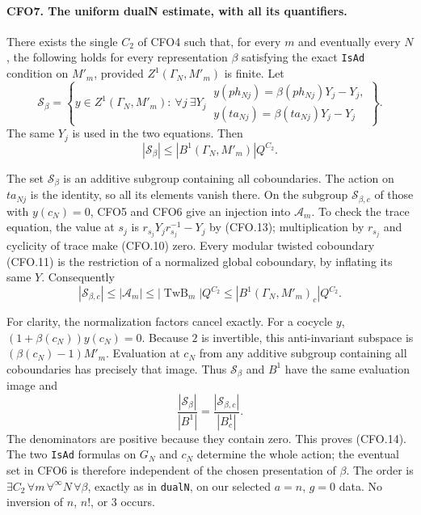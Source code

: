 \paragraph{CFO7. The uniform dualN estimate, with all its quantifiers.}
\label{claim:CFO7}
There exists the single $C_2$ of CFO4 such that, for every $m$
and eventually every $N$, the following holds for every
representation $\beta$ satisfying the exact \texttt{IsAd}
condition on $M'_m$, provided $Z^1(\Gamma_N,M'_m)$ is finite.
Let
\[
 \mathcal S_\beta=
 \left\{y\in Z^1(\Gamma_N,M'_m):
 \ \forall j\ \exists Y_j\
 \begin{matrix}
 y(ph_{Nj})=\beta(ph_{Nj})Y_j-Y_j,\\
 y(ta_{Nj})=\beta(ta_{Nj})Y_j-Y_j
 \end{matrix}\right\}.
 \]
The same $Y_j$ is used in the two equations.  Then
\[
 |\mathcal S_\beta|\le |B^1(\Gamma_N,M'_m)|Q^{C_2}.                \tag{CFO.14}
\]

The set $\mathcal S_\beta$ is an additive subgroup containing
all coboundaries.  The action on $ta_{Nj}$ is the identity, so
all its elements vanish there.  On the subgroup
$\mathcal S_{\beta,c}$ of those with $y(c_N)=0$, CFO5 and
CFO6 give an injection into $\mathcal A_m$.  To check the trace
equation, the value at $s_j$ is
$r_{s_j}Y_jr_{s_j}^{-1}-Y_j$ by (CFO.13); multiplication by
$r_{s_j}$ and cyclicity of trace make (CFO.10) zero.
Every modular twisted coboundary (CFO.11) is the restriction of
a normalized global coboundary, by inflating its same $Y$.
Consequently
\[
 |\mathcal S_{\beta,c}|
 \le |\mathcal A_m|
 \le |\operatorname{TwB}_m|Q^{C_2}
 \le |B^1(\Gamma_N,M'_m)_c|Q^{C_2}.                              \tag{CFO.15}
\]

For clarity, the normalization factors cancel exactly.
For a cocycle $y$, $(1+\beta(c_N))y(c_N)=0$.
Because $2$ is invertible, this anti-invariant subspace is
$(\beta(c_N)-1)M'_m$.  Evaluation at $c_N$ from any additive
subgroup containing all coboundaries has precisely that image.
Thus $\mathcal S_\beta$ and $B^1$ have the same evaluation
image and
\[
 \frac{|\mathcal S_\beta|}{|B^1|}
   =\frac{|\mathcal S_{\beta,c}|}{|B^1_c|}.
 \]
The denominators are positive because they contain zero.
This proves (CFO.14).  The two \texttt{IsAd} formulas on
$G_N$ and $c_N$ determine the whole action; the eventual
set in CFO6 is therefore independent of the chosen presentation
of $\beta$.  The order is
$\exists C_2\,\forall m\,\forall^\infty N\,\forall\beta$,
exactly as in \texttt{dualN}, on our selected $a=n$, $g=0$ data.
No inversion of $n$, $n!$, or $3$ occurs.

